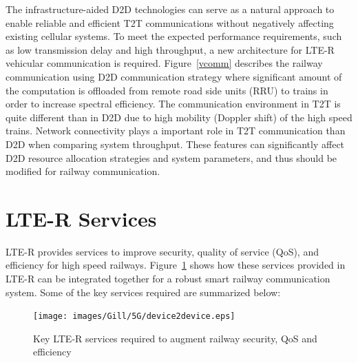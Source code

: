 The infrastructure-aided D2D technologies can serve as a natural approach to enable reliable and efficient T2T communications without negatively affecting existing cellular systems. To meet the expected performance requirements, such as low transmission delay and high throughput, a new architecture for LTE-R vehicular communication is required. Figure~\ref{vcomm} describes the railway communication  using D2D communication strategy where significant amount of the computation is offloaded from remote road side units (RRU) to trains in order to increase spectral efficiency. The communication environment in T2T is quite different than in D2D due to high mobility (Doppler shift) of the high speed trains. Network connectivity plays a important role in T2T communication than D2D when comparing system throughput. These features can significantly affect D2D resource allocation strategies and system parameters, and thus should be modified for railway communication.

\section{LTE-R Services}
LTE-R provides services to improve security, quality of service (QoS), and efficiency for high speed railways. Figure~\ref{d2d} shows how these services provided in LTE-R can be integrated together for a robust smart railway communication system. Some of the key services required are summarized below:
\begin{figure}[!ht]
	\centering
\texttt{[image: images/Gill/5G/device2device.eps]}
	\caption{Key LTE-R services required to augment railway security, QoS and efficiency}
	\label{d2d}
\end{figure}

